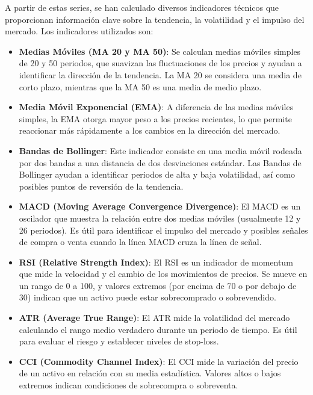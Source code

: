 \documentclass[a4paper,12pt, twoside]{report}
\begin{document}
A partir de estas series, se han calculado diversos indicadores técnicos que proporcionan información clave sobre la tendencia, la volatilidad y el impulso del mercado. Los indicadores utilizados son:

\begin{itemize}
    \item \textbf{Medias Móviles (MA 20 y MA 50)}: Se calculan medias móviles simples de 20 y 50 periodos, que suavizan las fluctuaciones de los precios y ayudan a identificar la dirección de la tendencia. La MA 20 se considera una media de corto plazo, mientras que la MA 50 es una media de medio plazo.
    
    \item \textbf{Media Móvil Exponencial (EMA)}: A diferencia de las medias móviles simples, la EMA otorga mayor peso a los precios recientes, lo que permite reaccionar más rápidamente a los cambios en la dirección del mercado.

    \item \textbf{Bandas de Bollinger}: Este indicador consiste en una media móvil rodeada por dos bandas a una distancia de dos desviaciones estándar. Las Bandas de Bollinger ayudan a identificar periodos de alta y baja volatilidad, así como posibles puntos de reversión de la tendencia.

    \item \textbf{MACD (Moving Average Convergence Divergence)}: El MACD es un oscilador que muestra la relación entre dos medias móviles (usualmente 12 y 26 periodos). Es útil para identificar el impulso del mercado y posibles señales de compra o venta cuando la línea MACD cruza la línea de señal.

    \item \textbf{RSI (Relative Strength Index)}: El RSI es un indicador de momentum que mide la velocidad y el cambio de los movimientos de precios. Se mueve en un rango de 0 a 100, y valores extremos (por encima de 70 o por debajo de 30) indican que un activo puede estar sobrecomprado o sobrevendido.

    \item \textbf{ATR (Average True Range)}: El ATR mide la volatilidad del mercado calculando el rango medio verdadero durante un periodo de tiempo. Es útil para evaluar el riesgo y establecer niveles de stop-loss.

    \item \textbf{CCI (Commodity Channel Index)}: El CCI mide la variación del precio de un activo en relación con su media estadística. Valores altos o bajos extremos indican condiciones de sobrecompra o sobreventa.
\end{itemize}
\end{document}
